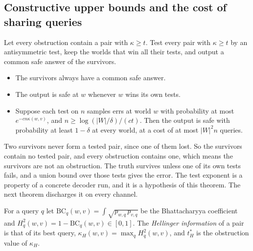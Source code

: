 \subsection{Constructive upper bounds and the cost of sharing queries}
\begin{theorem}
\label{thm:upper}
Let every obstruction contain a pair with $\kappa\ge t$. Test every pair with $\kappa\ge t$ by
an antisymmetric test, keep the worlds that win all their tests, and output a common safe
answer of the survivors.
\begin{itemize}
\item The survivors always have a common safe answer.
\item The output is safe at $w$ whenever $w$ wins its own tests.
\item Suppose each test on $n$ samples errs at world $w$ with probability at most
$e^{-cn\kappa(w,v)}$, and $n\ge\log(|W|/\delta)/(ct)$. Then the output is safe with probability
at least $1-\delta$ at every world, at a cost of at most $|W|^{2}n$ queries.
\end{itemize}
\end{theorem}


Two survivors never form a tested pair, since one of them lost. So the survivors contain no
tested pair, and every obstruction contains one, which means the survivors are not an
obstruction. The truth survives unless one of its own tests fails, and a union bound over those
tests gives the error. The test exponent is a property of a concrete decoder run, and it is a
hypothesis of this theorem. The next theorem discharges it on every channel.

For a query $q$ let $\mathrm{BC}_{q}(w,v)=\int\sqrt{p_{w,q}\,p_{v,q}}$ be the Bhattacharyya
coefficient and $H^{2}_{q}(w,v)=1-\mathrm{BC}_{q}(w,v)\in[0,1]$. The \emph{Hellinger
information} of a pair is that of its best query, $\kappa_{H}(w,v)=\max_{q}H^{2}_{q}(w,v)$, and
$t^{*}_{H}$ is the obstruction value of $\kappa_{H}$.

